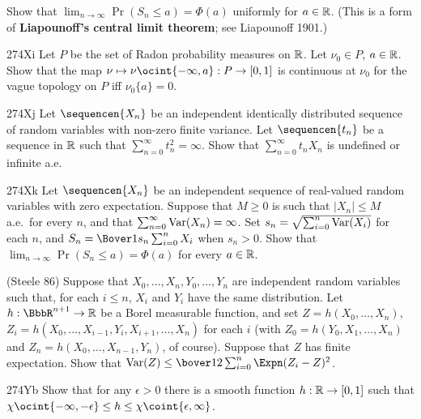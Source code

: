 {

\noindent  Show that $\lim_{n\to\infty}\Pr(S_n\le a)=\Phi(a)$ uniformly
for $a\in\Bbb R$.   (This is a form of {\bf Liapounoff's central limit
theorem};  see {\smc Liapounoff 1901}.)

\spheader 274Xi Let $P$ be the set of Radon probability measures
on $\Bbb R$.   Let $\nu_0\in P$, $a\in\Bbb R$.   Show that the map
$\nu\mapsto\nu\ocint{-\infty,a}:P\to[0,1]$ is continuous at $\nu_0$ for
the vague topology on $P$ iff $\nu_0\{a\}=0$.

\spheader 274Xj Let $\sequencen{X_n}$ be an independent identically
distributed sequence of random variables with non-zero
finite variance.   Let
$\sequencen{t_n}$ be a sequence in $\Bbb R$ such that
$\sum_{n=0}^{\infty}t_n^2=\infty$.   Show that $\sum_{n=0}^{\infty}t_nX_n$
is undefined or infinite a.e.   

\spheader 274Xk Let $\sequencen{X_n}$ be an independent
sequence of real-valued random variables with zero expectation.
Suppose that $M\ge 0$ is such that $|X_n|\le M$ a.e.\ for every $n$, and
that $\sum_{n=0}^{\infty}\mathop{\text{Var}}(X_n)=\infty$.   Set
$s_n=\sqrt{\sum_{i=0}^n\mathop{\text{Var}}(X_i)}$ for each $n$, and
$S_n=\Bover1{s_n}\sum_{i=0}^nX_i$ when $s_n>0$.   Show that
$\lim_{n\to\infty}\Pr(S_n\le a)=\Phi(a)$ for every $a\in\Bbb R$.

({\smc Steele 86})
Suppose that $X_0,\ldots,X_n,Y_0,\ldots,Y_n$ are independent random
variables such that, for each $i\le n$,
$X_i$ and $Y_i$ have the same distribution.
Let $h:\BbbR^{n+1}\to\Bbb R$ be a Borel measurable function, and set
$Z=h(X_0,\ldots,X_n)$, $Z_i=h(X_0,\ldots,X_{i-1},Y_i,X_{i+1},\ldots,X_n)$
for each $i$
(with $Z_0=h(Y_0,X_1,\ldots,X_n)$ and $Z_n=h(X_0,\ldots,X_{n-1},Y_n)$,
of course).   Suppose that $Z$ has finite expectation.   Show that
$\Var(Z)\le\bover12\sum_{i=0}^n\Expn(Z_i-Z)^2$.

\spheader 274Yb Show that for any $\epsilon>0$ there is a
smooth function $h:\Bbb R\to[0,1]$ such that
$\chi\ocint{-\infty,-\epsilon}\le h\le\chi\coint{\epsilon,\infty}$.

}
